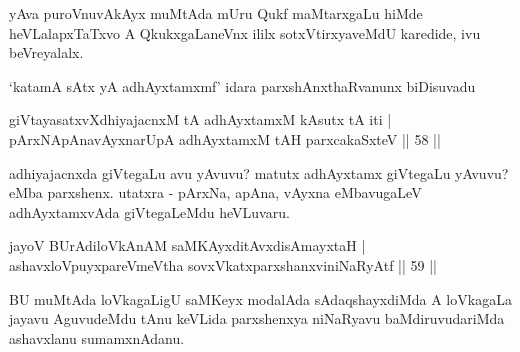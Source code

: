\begin{artha}
yAva puroVnuvAkAyx muMtAda mUru Qukf maMtarxgaLu hiMde heVLalapxTaTxvo A QkukxgaLaneVnx ililx sotxVtirxyaveMdU karedide, ivu beVreyalalx.
\end{artha}

\begin{artha}
`katamA sAtx yA adhAyxtamxmf' \mdash  idara parxshAnxthaRvanunx biDisuvadu \mdash 
\end{artha}

\begin{shl}
giVtayasatxvXdhiyajacnxM tA adhAyxtamxM kAsutx tA iti |\\
pArxNApAnavAyxnarUpA adhAyxtamxM tAH parxcakaSxteV \hfill || 58 ||
\end{shl}

\begin{artha}
adhiyajacnxda giVtegaLu avu yAvuvu? matutx adhAyxtamx giVtegaLu yAvuvu? eMba parxshenx. utatxra - pArxNa, apAna, vAyxna eMbavugaLeV adhAyxtamxvAda giVtegaLeMdu heVLuvaru.
\end{artha}

\begin{shl}
jayoV BUrAdiloVkAnAM saMKAyxditAvxdisAmayxtaH |\\
ashavxloV\s puyxpareVmeV\s tha sovxVkatxparxshanxviniNaRyAtf \hfill || 59 || 
\end{shl}

\begin{artha}
BU muMtAda loVkagaLigU saMKeyx modalAda sAdaqshayxdiMda A loVkagaLa jayavu AguvudeMdu tAnu keVLida parxshenxya niNaRyavu baMdiruvudariMda ashavxlanu sumamxnAdanu.
\end{artha}

\begin{center}
\end{center}
